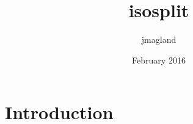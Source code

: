 \documentclass{article}
\title{isosplit}
\author{jmagland }
\date{February 2016}
\begin{document}
\maketitle

\section{Introduction}
\end{document}
